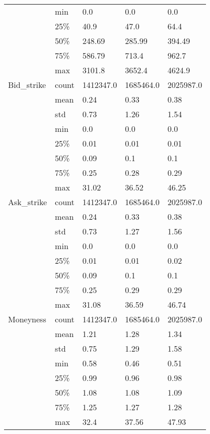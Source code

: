 \begin{tabular}{lllll}
  & min &        0.0 &        0.0 &        0.0 \\
  & 25\% &       40.9 &       47.0 &       64.4 \\
  & 50\% &     248.69 &     285.99 &     394.49 \\
  & 75\% &     586.79 &      713.4 &      962.7 \\
  & max &     3101.8 &     3652.4 &     4624.9 \\
Bid\_strike & count &  1412347.0 &  1685464.0 &  2025987.0 \\
  & mean &       0.24 &       0.33 &       0.38 \\
  & std &       0.73 &       1.26 &       1.54 \\
  & min &        0.0 &        0.0 &        0.0 \\
  & 25\% &       0.01 &       0.01 &       0.01 \\
  & 50\% &       0.09 &        0.1 &        0.1 \\
  & 75\% &       0.25 &       0.28 &       0.29 \\
  & max &      31.02 &      36.52 &      46.25 \\
Ask\_strike & count &  1412347.0 &  1685464.0 &  2025987.0 \\
  & mean &       0.24 &       0.33 &       0.38 \\
  & std &       0.73 &       1.27 &       1.56 \\
  & min &        0.0 &        0.0 &        0.0 \\
  & 25\% &       0.01 &       0.01 &       0.02 \\
  & 50\% &       0.09 &        0.1 &        0.1 \\
  & 75\% &       0.25 &       0.29 &       0.29 \\
  & max &      31.08 &      36.59 &      46.74 \\
Moneyness & count &  1412347.0 &  1685464.0 &  2025987.0 \\
  & mean &       1.21 &       1.28 &       1.34 \\
  & std &       0.75 &       1.29 &       1.58 \\
  & min &       0.58 &       0.46 &       0.51 \\
  & 25\% &       0.99 &       0.96 &       0.98 \\
  & 50\% &       1.08 &       1.08 &       1.09 \\
  & 75\% &       1.25 &       1.27 &       1.28 \\
  & max &       32.4 &      37.56 &      47.93 \\

\end{tabular}
